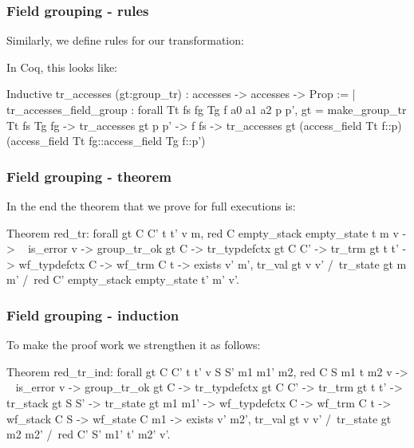 \begin{frame}[fragile]
\frametitle{Field grouping - rules}

Similarly, we define rules for our transformation:
\begin{center}
\end{center}

\bigskip

In Coq, this looks like:

\begin{coqs}
Inductive tr_accesses (gt:group_tr) : accesses -> accesses -> Prop :=
  | tr_accesses_field_group : forall Tt fs fg Tg f a0 a1 a2 p p',
      gt = make_group_tr Tt fs Tg fg ->
      tr_accesses gt p p' ->
      f \in fs ->
      tr_accesses gt (access_field Tt f::p) (access_field Tt fg::access_field Tg f::p')
\end{coqs}

\end{frame}


\begin{frame}[fragile]
\frametitle{Field grouping - theorem}

In the end the theorem that we prove for full executions is:

\begin{coq}
  Theorem red_tr: forall gt C C' t t' v m,
    red C empty_stack empty_state t m v ->
    ~ is_error v ->
    group_tr_ok gt C ->
    tr_typdefctx gt C C' ->
    tr_trm gt t t' ->
    wf_typdefctx C ->
    wf_trm C t ->
    exists v' m',		tr_val gt v v'
	  	   /\ tr_state gt m m'
		   /\ red C' empty_stack empty_state t' m' v'.
\end{coq}

\end{frame}


\begin{frame}[fragile]
\frametitle{Field grouping - induction}

To make the proof work we strengthen it as follows:

\begin{coq}
  Theorem red_tr_ind: forall gt C C' t t' v S S' m1 m1' m2,
    red C S m1 t m2 v ->
    ~ is_error v ->
    group_tr_ok gt C ->
    tr_typdefctx gt C C' ->
    tr_trm gt t t' ->
    tr_stack gt S S' ->
    tr_state gt m1 m1' ->
    wf_typdefctx C ->
    wf_trm C t ->
    wf_stack C S ->
    wf_state C m1 ->
    exists v' m2',				tr_val gt v v'
			  /\	tr_state gt m2 m2'
			  /\	red C' S' m1' t' m2' v'.
\end{coq}

\end{frame}


